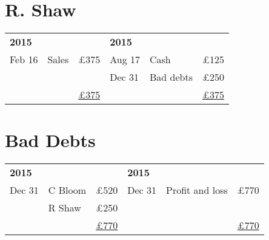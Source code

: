 \section*{R. Shaw}

\noindent
\begin{tabular}{@{}p{2cm}p{4cm}r|p{2cm}p{4cm}r@{}}
\toprule
\multicolumn{3}{l|}{\textbf{2015}} & \multicolumn{3}{l}{\textbf{2015}} \\
Feb 16 & Sales & \pounds 375 & Aug 17 & Cash & \pounds 125 \\
       &       &             & Dec 31 & Bad debts & \pounds 250 \\
       &       & \underline{\pounds 375} &       &         & \underline{\pounds 375} \\
\end{tabular}

\vspace{1.5cm}

\section*{Bad Debts}

\noindent
\begin{tabular}{@{}p{2cm}p{4cm}r|p{2cm}p{4cm}r@{}}
\toprule
\multicolumn{3}{l|}{\textbf{2015}} & \multicolumn{3}{l}{\textbf{2015}} \\
Dec 31 & C Bloom & \pounds 520 & Dec 31 & Profit and loss & \pounds 770 \\
       & R Shaw  & \pounds 250 &        &                 &             \\
       &         & \underline{\pounds 770} & &             & \underline{\pounds 770} \\
\end{tabular}
